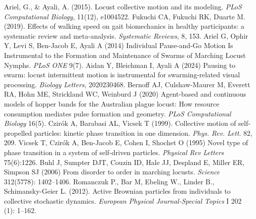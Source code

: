 \documentclass[11pt,a4paper]{article}
\begin{document}
\begin{thebibliography}{9}
Ariel, G., \& Ayali, A. (2015). Locust collective motion and its modeling. \emph{PLoS Computational Biology}, 11(12), e1004522.
Fukuchi CA, Fukuchi RK, Duarte M. (2019). Effects of walking speed on gait biomechanics in healthy participants: a systematic review and meta-analysis. \emph{Systematic Reviews}, 8, 153.
Ariel G, Ophir Y, Levi S, Ben-Jacob E, Ayali A (2014) Individual Pause-and-Go Motion Is Instrumental to the Formation and Maintenance of Swarms of Marching Locust Nymphs. \emph{PLoS ONE} 9(7).
Aidan Y, Bleichman I, Ayali A (2024) Pausing to swarm: locust intermittent motion is instrumental for swarming-related visual processing. \emph{Biology Letters}, 2020230468.
Bernoff AJ, Culshaw-Maurer M, Everett RA, Hohn ME, Strickland WC, Weinburd J (2020) Agent-based and continuous models of hopper bands for the Australian plague locust: How resource consumption mediates pulse formation and geometry. \emph{PLoS Computational Biology} 16(5).
Czirók A, Barabasi AL, Vicsek T (1999). Collective motion of self-propelled particles: kinetic phase transition in one dimension. \emph{Phys. Rev. Lett.} 82, 209.
Vicsek T, Czirók A, Ben-Jacob E, Cohen I, Shochet O (1995) Novel type of phase transition in a system of self-driven particles. \emph{Physical Rev Letters} 75(6):1226.
Buhl J, Sumpter DJT, Couzin ID, Hale JJ, Despland E, Miller ER, Simpson SJ (2006) From disorder to order in marching locusts. \emph{Science} 312(5778): 1402–1406.
Romanczuk P., Bar M, Ebeling W., Linder B., Schimansky-Geier L. (2012). Active Brownian particles from individuals to collective stochastic dynamics. \emph{European Physical Journal-Special Topics} I 202 (1): 1–162.
\end{thebibliography}
\end{document}
